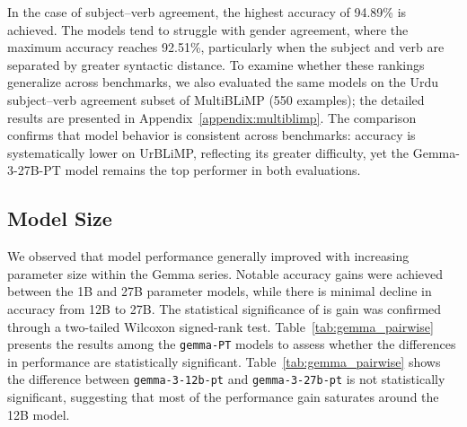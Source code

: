 \documentclass[11pt]{article}
\begin{document}
In the case of subject–verb agreement, the highest accuracy of 94.89\% is achieved. The models tend to struggle with gender agreement, where the maximum accuracy reaches 92.51\%, particularly when the subject and verb are separated by greater syntactic distance.
To examine whether these rankings generalize across benchmarks, we also evaluated the same models on the Urdu subject–verb agreement subset of MultiBLiMP (550 examples); the detailed results are presented in Appendix~\ref{appendix:multiblimp}. The comparison confirms that model behavior is consistent across benchmarks: accuracy is systematically lower on UrBLiMP, reflecting its greater difficulty, yet the Gemma-3-27B-PT model remains the top performer in both evaluations.  

\subsection{Model Size}
\begin{table}[!t]


\centering
\caption{Pairwise Wilcoxon signed-rank test results for Gemma-PT models on linguistic phenomena. Holm-corrected p-values are reported.}
\label{tab:gemma_pairwise}
\end{table}

We observed that model performance generally improved with increasing parameter size within the Gemma series. Notable accuracy gains were achieved between the 1B and 27B parameter models, while there is minimal decline in accuracy from 12B to 27B. The statistical significance of is gain was confirmed through a two-tailed Wilcoxon signed-rank test. Table~\ref{tab:gemma_pairwise} presents the results among the \texttt{gemma-PT} models to assess whether the differences in performance are statistically significant. Table~\ref{tab:gemma_pairwise} shows the difference between \texttt{gemma-3-12b-pt} and \texttt{gemma-3-27b-pt} is not statistically significant, suggesting that most of the performance gain saturates around the 12B model.
\end{document}
